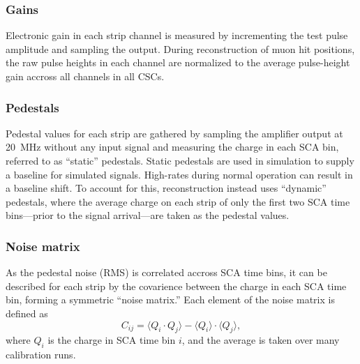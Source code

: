\subsubsection{Gains}
Electronic gain in each strip channel is measured by incrementing the test pulse amplitude and sampling the output. During reconstruction of muon hit positions, the raw pulse heights in each channel are normalized to the average pulse-height gain accross all channels in all CSCs.

\subsubsection{Pedestals}
Pedestal values for each strip are gathered by sampling the amplifier output at \SI{20}{MHz} without any input signal and measuring the charge in each SCA bin, referred to as ``static'' pedestals. Static pedestals are used in simulation to supply a baseline for simulated signals. High-rates during normal operation can result in a baseline shift. To account for this, reconstruction instead uses ``dynamic'' pedestals, where the average charge on each strip of only the first two SCA time bins---prior to the signal arrival---are taken as the pedestal values. 

\subsubsection{Noise matrix}
As the pedestal noise (RMS) is correlated accross SCA time bins, it can be described for each strip by the covarience between the charge in each SCA time bin, forming a symmetric ``noise matrix.'' Each element of the noise matrix is defined as 
\begin{equation}
C_{ij} = \langle Q_i \cdot Q_j \rangle - \langle Q_i \rangle \cdot \langle Q_j \rangle,
\end{equation}
where $Q_i$ is the charge in SCA time bin $i$, and the average is taken over many calibration runs.

